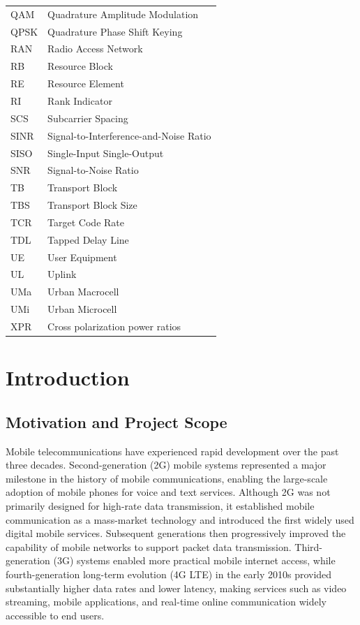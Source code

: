 \documentclass[a4paper,12pt,onecolumn]{article}
\begin{document}
\begin{longtable}{p{3cm}p{10cm}}
	
	QAM     & Quadrature Amplitude Modulation \\
	QPSK    & Quadrature Phase Shift Keying \\
	
	RAN     & Radio Access Network \\
	RB      & Resource Block \\
	RE      & Resource Element \\
	RI      & Rank Indicator \\
	
	SCS     & Subcarrier Spacing \\
	SINR    & Signal-to-Interference-and-Noise Ratio \\
	SISO    & Single-Input Single-Output \\
	SNR     & Signal-to-Noise Ratio \\
	
	TB      & Transport Block \\
	TBS     & Transport Block Size \\
	TCR     & Target Code Rate \\
	TDL     & Tapped Delay Line \\
	
	UE      & User Equipment \\
	UL      & Uplink \\
	UMa &  Urban Macrocell \\
	UMi & Urban Microcell \\
	
	XPR & Cross polarization power ratios \\
	
\end{longtable}
\newpage

\section{Introduction}
\subsection{Motivation and Project Scope}
	Mobile telecommunications have experienced rapid development over the past three decades. Second-generation (2G) mobile systems represented a major milestone in the history of mobile communications, enabling the large-scale adoption of mobile phones for voice and text services. Although 2G was not primarily designed for high-rate data transmission, it established mobile communication as a mass-market technology and introduced the first widely used digital mobile services. Subsequent generations then progressively improved the capability of mobile networks to support packet data transmission. Third-generation (3G) systems enabled more practical mobile internet access, while fourth-generation long-term evolution (4G LTE) in the early 2010s provided substantially higher data rates and lower latency, making services such as video streaming, mobile applications, and real-time online communication widely accessible to end users.
	
\end{document}
